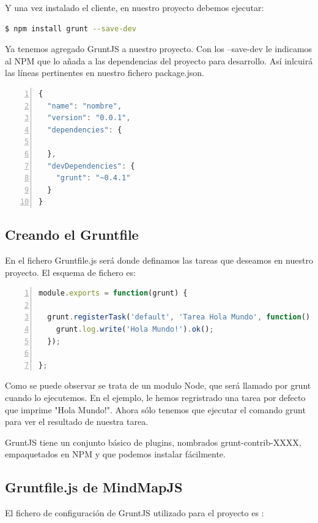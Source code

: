 Y una vez instalado el cliente, en nuestro proyecto debemos ejecutar:

\begin{lstlisting}[language=bash, numbers=none]
$ npm install grunt --save-dev
\end{lstlisting}

Ya tenemos agregado GruntJS a nuestro proyecto. Con los --save-dev le indicamos al NPM que lo añada a las dependencias del proyecto para desarrollo. Así inlcuirá las líneas pertinentes en nuestro fichero package.json.

\begin{lstlisting}[language=JavaScript, numbers=left]
{
  "name": "nombre",
  "version": "0.0.1",
  "dependencies": { 
 
  },
  "devDependencies": {
    "grunt": "~0.4.1"
  }
}
\end{lstlisting}


\subsection{Creando el Gruntfile}
En el fichero Gruntfile.js será donde definamos las tareas que deseamos en nuestro proyecto. El esquema de fichero es:

\begin{lstlisting}[language=JavaScript, numbers=left]
module.exports = function(grunt) {
 
  grunt.registerTask('default', 'Tarea Hola Mundo', function() {
    grunt.log.write('Hola Mundo!').ok();
  });
 
};
\end{lstlisting}

Como se puede observar se trata de un modulo Node, que será llamado por grunt cuando lo ejecutemos. En el ejemplo, le hemos regristrado una tarea por defecto que imprime "Hola Mundo!". Ahora sólo tenemos que ejecutar el comando grunt para ver el resultado de nuestra tarea.

GruntJS tiene un conjunto básico de plugins, nombrados grunt-contrib-XXXX, empaquetados en NPM y que podemos instalar fácilmente. 

\subsection{Gruntfile.js de MindMapJS}

El fichero de configuración de GruntJS utilizado para el proyecto es :




